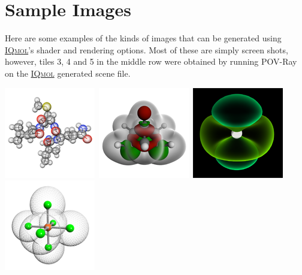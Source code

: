\documentclass[a4paper,12pt]{article}
\newcommand{\iqmol}{\href{https://www.iqmol.org}{{\scshape IQmol}}}
\begin{document}
\newpage
\section{Sample Images}

Here are some examples of the kinds of images that can be generated using
\iqmol{}'s shader and rendering options.  Most of these are simply screen
shots, however, tiles 3, 4 and 5 in the middle row were obtained by 
running POV-Ray on the \iqmol{} generated scene file.

\begin{center}
\includegraphics[scale=0.58]{figures/gallery/g13_sm.png}\
\includegraphics[scale=0.58]{figures/gallery/g14_sm.png}\
\includegraphics[scale=0.58]{figures/gallery/g15_sm.png}\
\includegraphics[scale=0.58]{figures/gallery/g16_sm.png}\

\end{center}
\end{document}
